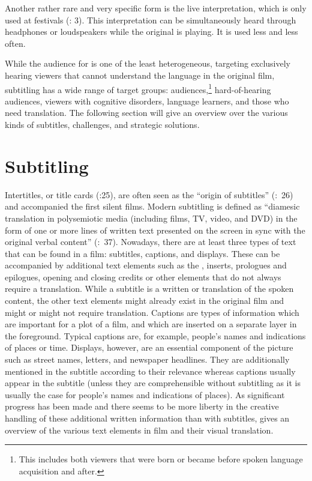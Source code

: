 Another rather rare and very specific form is the live interpretation, which is only used at festivals (\citealt{Jungst2010}: 3). This interpretation can be simultaneously heard through headphones or loudspeakers while the original is playing. It is used less and less often.

\newpage 
While the audience for  is one of the least heterogeneous, targeting exclusively hearing viewers that cannot understand the language in the original film, subtitling has a wide range of target groups:  audiences,\footnote{This includes both viewers that were born  or became  before spoken language acquisition and after.} hard-of-hearing audiences, viewers with cognitive disorders, language learners, and those who need  translation. The following section will give an overview over the various kinds of subtitles, challenges, and strategic solutions.

\section{Subtitling}\label{sec:1.1}

Intertitles, or title cards (\citealt{Diaz_cintas2007}:25), are often seen as the “origin of subtitles” (\citealt{Diaz_cintas2007}:~26) and accompanied the first silent films. Modern subtitling is defined as “diamesic translation in polysemiotic media (including films, TV, video, and DVD) in the form of one or more lines of written text presented on the screen in sync with the original verbal content” (\citealt{Gottlieb2012}:~37). Nowadays, there are at least three types of text that can be found in a film: subtitles, captions, and displays. These can be accompanied by additional text elements such as the , inserts, prologues and epilogues, opening and closing credits or other elements that do not always require a translation. While a subtitle is a written  or  translation of the spoken content, the other text elements might already exist in the original film and might or might not require translation. Captions are types of information which are important for a plot of a film, and which are inserted on a separate layer in the foreground. Typical captions are, for example, people’s names and indications of places or time. Displays, however, are an essential component of the picture such as street names, letters, and newspaper headlines. They are additionally mentioned in the subtitle according to their relevance whereas captions usually appear in the subtitle (unless they are comprehensible without subtitling as it is usually the case for people’s names and indications of places). As significant progress has been made and there seems to be more liberty in the creative handling of these additional written information than with subtitles,  gives an overview of the various text elements in film and their visual translation. 

